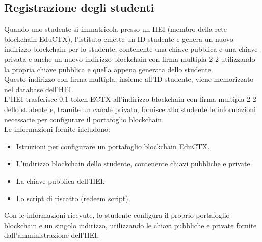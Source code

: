 \subsection{Registrazione degli studenti}
Quando uno studente si immatricola presso un HEI (membro della rete blockchain EduCTX), l'istituto emette un ID studente e genera un nuovo indirizzo blockchain per lo studente, contenente una chiave pubblica e una chiave privata
e anche un nuovo indirizzo blockchain con firma multipla 2-2 utilizzando la propria chiave pubblica e quella appena generata dello studente. 
\\Questo indirizzo con firma multipla, insieme all'ID studente, viene memorizzato nel database dell'HEI.
\\L'HEI trasferisce 0,1 token ECTX all'indirizzo blockchain con firma multipla 2-2 dello studente e, tramite un canale privato, fornisce allo studente le informazioni necessarie per configurare il portafoglio blockchain. 
\\Le informazioni fornite includono:
\begin{itemize}
    \item Istruzioni per configurare un portafoglio blockchain EduCTX.
    \item L'indirizzo blockchain dello studente, contenente chiavi pubbliche e private.
    \item La chiave pubblica dell'HEI.
    \item Lo script di riscatto (redeem script).
\end{itemize}
Con le informazioni ricevute, lo studente configura il proprio portafoglio blockchain e un singolo indirizzo, utilizzando le chiavi pubbliche e private fornite dall'amministrazione dell'HEI.

